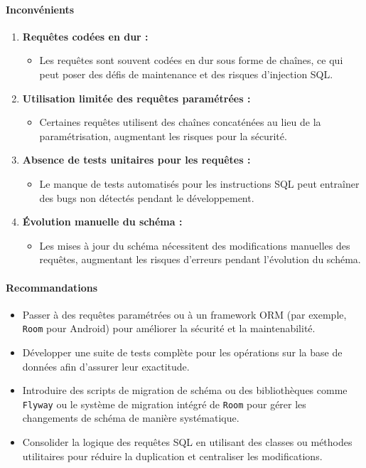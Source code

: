 \paragraph{Inconvénients}
\begin{enumerate}
    \item \textbf{Requêtes codées en dur :}
          \begin{itemize}
              \item Les requêtes sont souvent codées en dur sous forme de chaînes, ce qui peut poser des défis de maintenance et des risques d'injection SQL.
          \end{itemize}
    \item \textbf{Utilisation limitée des requêtes paramétrées :}
          \begin{itemize}
              \item Certaines requêtes utilisent des chaînes concaténées au lieu de la paramétrisation, augmentant les risques pour la sécurité.
          \end{itemize}
    \item \textbf{Absence de tests unitaires pour les requêtes :}
          \begin{itemize}
              \item Le manque de tests automatisés pour les instructions SQL peut entraîner des bugs non détectés pendant le développement.
          \end{itemize}
    \item \textbf{Évolution manuelle du schéma :}
          \begin{itemize}
              \item Les mises à jour du schéma nécessitent des modifications manuelles des requêtes, augmentant les risques d'erreurs pendant l'évolution du schéma.
          \end{itemize}
\end{enumerate}

\paragraph{Recommandations}
\begin{itemize}
    \item Passer à des requêtes paramétrées ou à un framework ORM (par exemple, \texttt{Room} pour Android) pour améliorer la sécurité et la maintenabilité.
    \item Développer une suite de tests complète pour les opérations sur la base de données afin d'assurer leur exactitude.
    \item Introduire des scripts de migration de schéma ou des bibliothèques comme \texttt{Flyway} ou le système de migration intégré de \texttt{Room} pour gérer les changements de schéma de manière systématique.
    \item Consolider la logique des requêtes SQL en utilisant des classes ou méthodes utilitaires pour réduire la duplication et centraliser les modifications.
\end{itemize}
